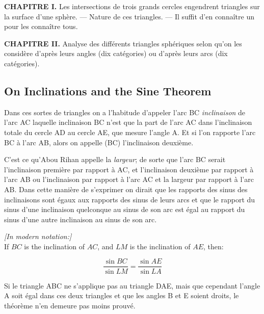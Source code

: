 \documentclass[11pt,a4paper]{article}
\theoremstyle{plain}
\theoremstyle{definition}
\theoremstyle{remark}
\begin{document}
\textbf{CHAPITRE I.} Les intersections de trois grands cercles engendrent triangles sur la surface d'une sphère. --- Nature de ces triangles. --- Il suffit d'en connaître un pour les connaître tous.



\textbf{CHAPITRE II.} Analyse des différents triangles sphériques selon qu'on les considère d'après leurs angles (dix catégories) ou d'après leurs arcs (dix catégories).





\subsection{On Inclinations and the Sine Theorem}

\label{sec:inclinations}





Dans ces sortes de triangles on a l'habitude d'appeler l'arc BC \textit{inclinaison} de l'arc AC laquelle inclinaison BC n'est que la part de l'arc AC dans l'inclinaison totale du cercle AD au cercle AE, que mesure l'angle A. Et si l'on rapporte l'arc BC à l'arc AB, alors on appelle (BC) l'inclinaison deuxième.



C'est ce qu'Abou Rihan appelle la \textit{largeur}; de sorte que l'arc BC serait l'inclinaison première par rapport à AC, et l'inclinaison deuxième par rapport à l'arc AB ou l'inclinaison par rapport à l'arc AC et la largeur par rapport à l'arc AB. Dans cette manière de s'exprimer on dirait que les rapports des sinus des inclinaisons sont égaux aux rapports des sinus de leurs arcs et que le rapport du sinus d'une inclinaison quelconque au sinus de son arc est égal au rapport du sinus d'une autre inclinaison au sinus de son arc.





\noindent\textit{[In modern notation:]}\\

If $BC$ is the inclination of $AC$, and $LM$ is the inclination of $AE$, then:

\[

\frac{\sin BC}{\sin LM} = \frac{\sin AE}{\sin LA}

\]





Si le triangle ABC ne s'applique pas au triangle DAE, mais que cependant l'angle A soit égal dans ces deux triangles et que les angles B et E soient droits, le théorème n'en demeure pas moins prouvé.
\end{document}
